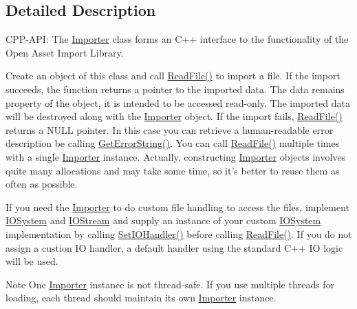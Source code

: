 \subsection{Detailed Description}
C\-P\-P-\/\-A\-P\-I\-: The \hyperlink{class_assimp_1_1_importer}{Importer} class forms an C++ interface to the functionality of the Open Asset Import Library.

Create an object of this class and call \hyperlink{class_assimp_1_1_importer_a174418ab41d5b8bc51a044895cb991e5}{Read\-File()} to import a file. If the import succeeds, the function returns a pointer to the imported data. The data remains property of the object, it is intended to be accessed read-\/only. The imported data will be destroyed along with the \hyperlink{class_assimp_1_1_importer}{Importer} object. If the import fails, \hyperlink{class_assimp_1_1_importer_a174418ab41d5b8bc51a044895cb991e5}{Read\-File()} returns a N\-U\-L\-L pointer. In this case you can retrieve a human-\/readable error description be calling \hyperlink{class_assimp_1_1_importer_a23bab5ba8cb9b6886c690a610766668b}{Get\-Error\-String()}. You can call \hyperlink{class_assimp_1_1_importer_a174418ab41d5b8bc51a044895cb991e5}{Read\-File()} multiple times with a single \hyperlink{class_assimp_1_1_importer}{Importer} instance. Actually, constructing \hyperlink{class_assimp_1_1_importer}{Importer} objects involves quite many allocations and may take some time, so it's better to reuse them as often as possible.

If you need the \hyperlink{class_assimp_1_1_importer}{Importer} to do custom file handling to access the files, implement \hyperlink{class_assimp_1_1_i_o_system}{I\-O\-System} and \hyperlink{class_assimp_1_1_i_o_stream}{I\-O\-Stream} and supply an instance of your custom \hyperlink{class_assimp_1_1_i_o_system}{I\-O\-System} implementation by calling \hyperlink{class_assimp_1_1_importer_a1161f46318af18bb86dfe0fc3edea4df}{Set\-I\-O\-Handler()} before calling \hyperlink{class_assimp_1_1_importer_a174418ab41d5b8bc51a044895cb991e5}{Read\-File()}. If you do not assign a custion I\-O handler, a default handler using the standard C++ I\-O logic will be used.

\begin{DoxyNote}{Note}
One \hyperlink{class_assimp_1_1_importer}{Importer} instance is not thread-\/safe. If you use multiple threads for loading, each thread should maintain its own \hyperlink{class_assimp_1_1_importer}{Importer} instance. 
\end{DoxyNote}


